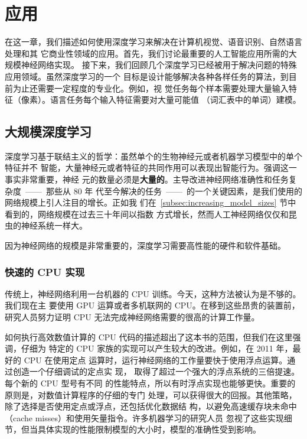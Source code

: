 \chapter{应用}
\label{ch:applications}

在这一章，我们描述如何使用深度学习来解决在计算机视觉、语音识别、自然语言处理和其
它商业性领域的应用。首先，我们讨论最重要的人工智能应用所需的大规模神经网络实现。
接下来，我们回顾几个深度学习已经被用于解决问题的特殊应用领域。虽然深度学习的一个
目标是设计能够解决各种各样任务的算法，到目前为止还需要一定程度的专业化。例如，视
觉任务每个样本需要处理大量输入特征（像素）。语言任务每个输入特征需要对大量可能值
（词汇表中的单词）建模。

\section{大规模深度学习}
\label{sec:large_scale_deep_learning}

深度学习基于联结主义的哲学：虽然单个的生物神经元或者机器学习模型中的单个特征并不
智能，大量神经元或者特征的共同作用可以表现出智能行为。强调这一事实非常重要，神经
元的数量必须是\textbf{大量的}。主导改进神经网络准确性和任务复杂度~——~那些从 80 年
代至今解决的任务~——~的一个关键因素，是我们使用的网络规模上引人注目的增长。正如我
们在~\ref{subsec:increasing_model_sizes} 节中看到的，网络规模在过去三十年间以指数
方式增长，然而人工神经网络仅仅和昆虫的神经系统一样大。

因为神经网络的规模是非常重要的，深度学习需要高性能的硬件和软件基础。

\subsection{快速的 CPU 实现}
\label{subsec:fast_cpu_implementations}

传统上，神经网络利用一台机器的 CPU 训练。今天，这种方法被认为是不够的。我们现在主
要使用 GPU 运算或者多机联网的 CPU。在移到这些昂贵的装置前，研究人员努力证明 CPU
无法完成神经网络需要的很高的计算工作量。

如何执行高效数值计算的 CPU 代码的描述超出了这本书的范围，但我们在这里强调，仔细为
特定的 CPU 家族的实现可以产生较大的改进。例如，在 2011 年，最好的 CPU 在使用定点
运算时，运行神经网络的工作量要快于使用浮点运算。通过创造一个仔细调试的定点实
现，\citet{37631} 取得了超过一个强大的浮点系统的三倍提速。每个新的 CPU 型号有不同
的性能特点，所以有时浮点实现也能够更快。重要的原则是，对数值计算程序的仔细的专门
处理，可以获得很大的回报。其他策略，除了选择是否使用定点或浮点，还包括优化数据结
构，以避免高速缓存块未命中（cache misses）和使用矢量指令。许多机器学习的研究人员
忽视了这些实现细节，但当具体实现的性能限制模型的大小时，模型的准确性受到影响。

